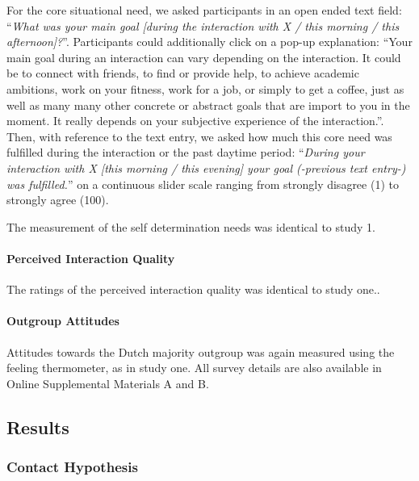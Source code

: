 For the core situational need, we asked participants in an open ended
text field:
``\textit{What was your main goal [during the interaction with X / this morning / this afternoon]?}''.
Participants could additionally click on a pop-up explanation: ``Your
main goal during an interaction can vary depending on the interaction.
It could be to connect with friends, to find or provide help, to achieve
academic ambitions, work on your fitness, work for a job, or simply to
get a coffee, just as well as many many other concrete or abstract goals
that are import to you in the moment. It really depends on your
subjective experience of the interaction.''. Then, with reference to the
text entry, we asked how much this core need was fulfilled during the
interaction or the past daytime period:
``\textit{During your interaction with X [this morning / this evening] your goal (-previous text entry-) was fulfilled.}''
on a continuous slider scale ranging from strongly disagree (1) to
strongly agree (100).

The measurement of the self determination needs was identical to study
1.

\paragraph{Perceived Interaction Quality}

The ratings of the perceived interaction quality was identical to study
one..

\paragraph{Outgroup Attitudes}

Attitudes towards the Dutch majority outgroup was again measured using
the feeling thermometer, as in study one. All survey details are also
available in Online Supplemental Materials A and B.




\subsection{Results}

\subsubsection{Contact Hypothesis}

